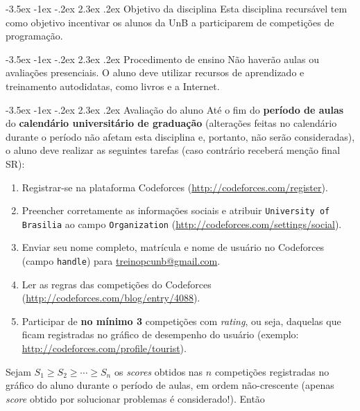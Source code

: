 \documentclass{UnBExam}%
\makeatletter
\newcommand{\numerocontests}{3}
\renewcommand\section{\@startsection{section}{1}{\z@}%
	{-3.5ex \@plus -1ex \@minus -.2ex}%
	{2.3ex \@plus.2ex}%
	{\normalfont\normalsize\bfseries}}%
\renewcommand{\indent}{\hspace{.5cm}}
\makeatother
\begin{document}
\section{Objetivo da disciplina}
\indent Esta disciplina recursável tem como objetivo incentivar os alunos da UnB a participarem de competições de programação.

\vspace{-.1cm}
\section{Procedimento de ensino}
\indent Não haverão aulas ou avaliações presenciais. O aluno deve utilizar recursos de aprendizado e treinamento autodidatas, como livros \cite{halim2013competitive,cormen2009introduction} e a Internet.

\vspace{-.1cm}
\section{Avaliação do aluno}
\indent Até o fim do \textbf{período de aulas} do \textbf{calendário universitário de graduação} (alterações feitas no calendário durante o período não afetam esta disciplina e, portanto, não serão consideradas), o aluno deve realizar as seguintes tarefas (caso contrário receberá menção final SR):
\begin{enumerate}
	\item Registrar-se na plataforma Codeforces (\url{http://codeforces.com/register}).
	\item Preencher corretamente as informações sociais e atribuir \texttt{University of Brasilia} ao campo \texttt{Organization} (\url{http://codeforces.com/settings/social}).
	\item Enviar seu nome completo, matrícula e nome de usuário no Codeforces (campo \texttt{handle}) para \url{treinopcunb@gmail.com}.
	\item Ler as regras das competições do Codeforces (\url{http://codeforces.com/blog/entry/4088}).
	\item Participar de \textbf{no mínimo \numerocontests} competições com \textit{rating}, ou seja, daquelas que ficam registradas no gráfico de desempenho do usuário (exemplo: \url{http://codeforces.com/profile/tourist}).
\end{enumerate}
\indent Sejam $S_1 \geq S_2 \geq \cdots \geq S_n$ os \textit{scores} obtidos nas $n$ competições registradas no gráfico do aluno durante o período de aulas, em ordem não-crescente (apenas \textit{score} obtido por solucionar problemas é considerado!). Então
\end{document}
